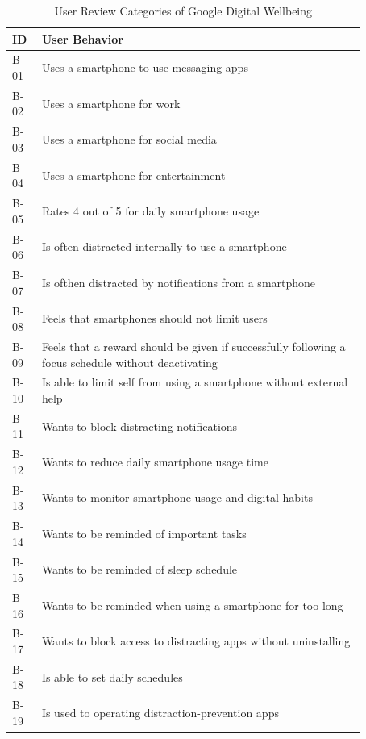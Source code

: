 \documentclass[conference]{IEEEtran}
\begin{document}
\RaggedLeft
\begin{table}[htbp]
  \caption{User Review Categories of Google Digital Wellbeing}
  \begin{footnotesize}
    \begin{center}
      \begin{tabular}{|m{0.07\linewidth}|m{0.8\linewidth}|}
        \hline
        \centering\textbf{ID} & \textbf{User Behavior}\\ \hline
      \centering B-01  &  Uses a smartphone to use messaging apps \\ \hline
      \centering B-02  &  Uses a smartphone for work \\ \hline
      \centering B-03  &  Uses a smartphone for social media \\ \hline
      \centering B-04  &  Uses a smartphone for entertainment \\ \hline
      \centering B-05  &  Rates 4 out of 5 for daily smartphone usage \\ \hline
      \centering B-06  &  Is often distracted internally to use a smartphone \\ \hline
      \centering B-07  &  Is ofthen distracted by notifications from a smartphone \\ \hline
      \centering B-08  &  Feels that smartphones should not limit users \\ \hline
      \centering B-09  &  Feels that a reward should be given if successfully following a focus schedule without deactivating \\ \hline
      \centering B-10  &  Is able to limit self from using a smartphone without external help \\ \hline
      \centering B-11  &  Wants to block distracting notifications \\ \hline
      \centering B-12  &  Wants to reduce daily smartphone usage time \\ \hline
      \centering B-13  &  Wants to monitor smartphone usage and digital habits \\ \hline
      \centering B-14  &  Wants to be reminded of important tasks \\ \hline
      \centering B-15  &  Wants to be reminded of sleep schedule \\ \hline
      \centering B-16  &  Wants to be reminded when using a smartphone for too long \\ \hline
      \centering B-17  &  Wants to block access to distracting apps without uninstalling \\ \hline
      \centering B-18  &  Is able to set daily schedules \\ \hline
      \centering B-19  &  Is used to operating distraction-prevention apps \\ \hline
    \end{tabular}
    \label{tab:behavior}
  \end{center}
\end{footnotesize}
\end{table}
\justifying
\end{document}
